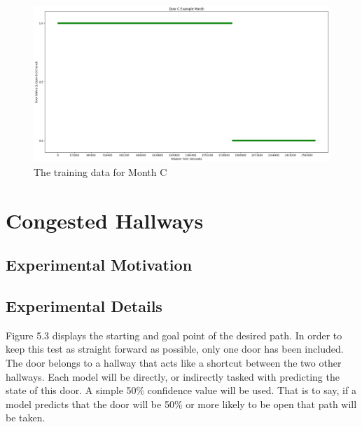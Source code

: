   \begin{figure}[!htb]
    \centering
    \includegraphics[width=\linewidth]{images/Door_C_Example_Month.png}
    \caption{The training data for Month C}
    \label{figure:Door C Training Month}
  \end{figure}

  \section{ Congested Hallways }

  \subsection{ Experimental Motivation }



  \subsection{ Experimental Details }

  Figure 5.3 displays the starting and goal point of the
  desired path. In order to keep this test as straight forward as possible, only
  one door has been included. The door belongs to a hallway that acts like a
  shortcut between the two other hallways. Each model will be directly, or
  indirectly tasked with predicting the state of this door. A simple 50\%
  confidence value will be used. That is to say, if a model predicts that the
  door will be 50\% or more likely to be open that path will be taken. \\


